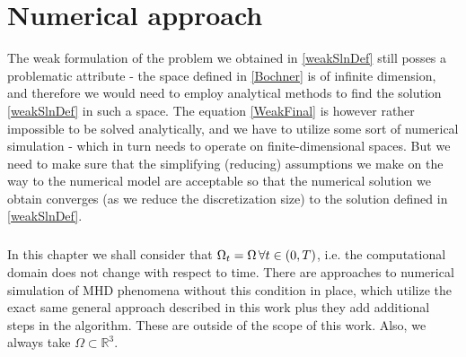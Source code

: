 \chapter{Numerical approach}
The weak formulation of the problem we obtained in \ref{weakSlnDef} still posses a problematic attribute - the space defined in \ref{Bochner} is of infinite dimension, and therefore we would need to employ analytical methods to find the solution \ref{weakSlnDef} in such a space. The equation \ref{WeakFinal} is however rather impossible to be solved analytically, and we have to utilize some sort of numerical simulation - which in turn needs to operate on finite-dimensional spaces. But we need to make sure that the simplifying (reducing) assumptions we make on the way to the numerical model are acceptable so that the numerical solution we obtain converges (as we reduce the discretization size) to the solution defined in \ref{weakSlnDef}.

\paragraph{}
In this chapter we shall consider that $\Omega_t = \Omega\, \forall t \in \left( 0, T\right) $, i.e. the computational domain does not change with respect to time. There are approaches to numerical simulation of MHD phenomena without this condition in place, which utilize the exact same general approach described in this work plus they add additional steps in the algorithm. These are outside of the scope of this work. Also, we always take $\Omega \subset \mathbb{R}^3$.




















